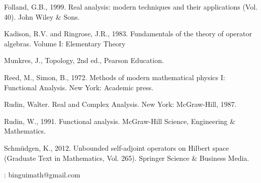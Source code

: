 \documentclass[12pt,a4paper,notitlepage]{article}
\theoremstyle{definition}
\theoremstyle{plain}
\numberwithin{equation}{section}
\begin{document}
\printindex	
	\begin{thebibliography}{999999}
		\footnotesize	
		
		
		
		
		
Folland, G.B., 1999. Real analysis: modern techniques and their applications (Vol. 40). John Wiley \& Sons.	
		
Kadison, R.V. and Ringrose, J.R., 1983. Fundamentals of the theory of operator algebras. Volume I: Elementary Theory

Munkres, J., Topology, 2nd ed., Pearson Education.

Reed, M., Simon, B., 1972. Methods of modern mathematical physics I: Functional Analysis. New York: Academic press.

Rudin, Walter. Real and Complex Analysis. New York: McGraw-Hill, 1987.
		
Rudin, W., 1991. Functional analysis. McGraw-Hill Science, Engineering \& Mathematics.
	
Schm\"udgen, K., 2012. Unbounded self-adjoint operators on Hilbert space (Graduate Text in Mathematics, Vol. 265). Springer Science \& Business Media.
		
		
		
		
		
	\end{thebibliography}
	
	: binguimath@gmail.com
\end{document}
